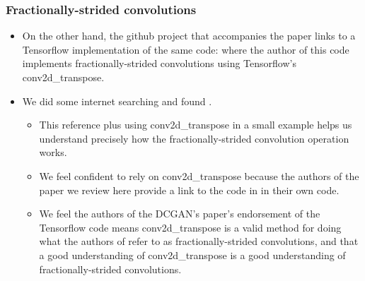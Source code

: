 \documentclass{beamer}
\begin{document}
\begin{frame}
\frametitle{Fractionally-strided convolutions}
\begin{itemize} 
  \item On the other hand, the github project \cite{dcganCode}
  that accompanies the paper \cite{repLearnDcgan} links to a Tensorflow
  implementation of the same code: \cite{dcganTf} where the author of this code
  implements fractionally-strided convolutions using Tensorflow's
  conv2d\_transpose.  
    
  \item We did some internet searching and found \cite{convArith}.
  \begin{itemize} 
    
  \item This reference plus using conv2d\_transpose in a small
      example helps us understand precisely how the fractionally-strided convolution
      operation works.  
    
      \item We feel confident to rely on conv2d\_transpose because
      the authors of the paper \cite{repLearnDcgan} we review here provide a link to
      the code in \cite{dcganTf} in their own code. 
          
      \item We feel the authors of the DCGAN's paper's endorsement of the
      Tensorflow code means conv2d\_transpose is a valid method for doing what the
      authors of \cite{repLearnDcgan} refer to as fractionally-strided convolutions,
      and that a good understanding of conv2d\_transpose is a good understanding of
      fractionally-strided convolutions.  
   \end{itemize} 
\end{itemize}
\end{frame}

\end{document}

